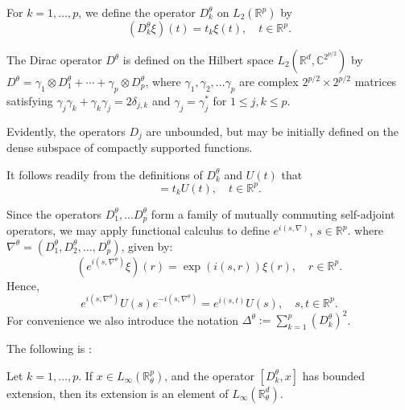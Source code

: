     \begin{defi}
        For $k = 1,\ldots,p$, we define the operator $D_k^\theta$ on $L_2(\mathbb{R}^p)$ by
        \begin{equation*}
            (D_k^\theta\xi)(t) = t_k\xi(t),\quad t \in \mathbb{R}^p.
        \end{equation*}
        
        The Dirac operator $D^\theta$ is defined on the Hilbert space $L_2(\mathbb{R}^d,\mathbb{C}^{2^{p/2}})$ by 
        $D^\theta = \gamma_1\otimes D^\theta_1+\cdots +\gamma_p\otimes D^\theta_p$, where $\gamma_1,\gamma_2,\ldots\gamma_p$
        are complex $2^{p/2}\times 2^{p/2}$ matrices satisfying $\gamma_j\gamma_k+\gamma_k\gamma_j = 2\delta_{j,k}$ and $\gamma_j = \gamma_j^*$ for $1\leq j,k \leq p$.
    \end{defi}
    Evidently, the operators $D_j$ are unbounded, but may be initially defined on the dense subspace of compactly supported functions.
    
    It follows readily from the definitions of $D_k^\theta$ and $U(t)$ that
    \begin{equation*}
        [D_k^\theta,U(t)] = t_kU(t),\quad t \in \mathbb{R}^p.
    \end{equation*}
    
    Since the operators $D_1^\theta,\ldots D_p^\theta$ form a family of mutually commuting self-adjoint operators, we may apply functional calculus to define $e^{i(s,\nabla)}$, $s \in \mathbb{R}^p$.
    where $\nabla^\theta = (D_1^\theta,D_2^\theta,\ldots,D_p^\theta)$, given by:
    \begin{equation*}
        (e^{i(s,\nabla^\theta)}\xi)(r) = \exp(i(s,r))\xi(r),\quad r \in \mathbb{R}^p.
    \end{equation*}
    Hence,
    \begin{equation*}
        e^{i(s,\nabla^\theta)}U(s)e^{-i(s,\nabla^\theta)} = e^{i(s,t)}U(s),\quad s,t \in \mathbb{R}^p.
    \end{equation*}
    For convenience we also introduce the notation $\Delta^\theta := \sum_{k=1}^p (D_k^\theta)^2$.
    
    The following is \cite[Proposition 6.12]{LeSZ-cwikel}:
    \begin{lem}\label{nc poincare}
        Let $k = 1,\ldots,p$. If $x \in L_\infty(\mathbb{R}^p_\theta)$, and the operator $[D_k^\theta,x]$ has bounded extension, then its extension is an element
        of $L_\infty(\mathbb{R}^d_\theta)$.
    \end{lem}
    

